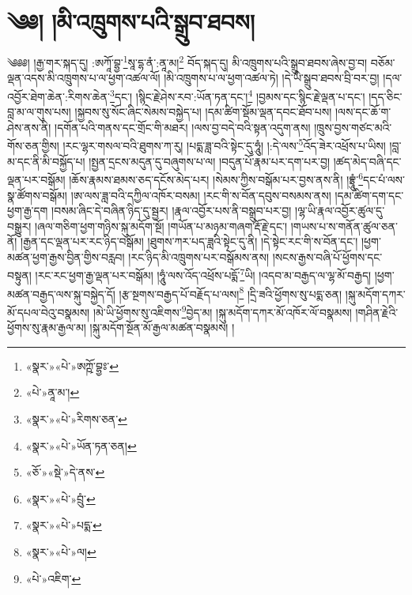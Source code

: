 \chapter{༄༅། །མི་འཁྲུགས་པའི་སྒྲུབ་ཐབས།}༄༅༅། །རྒྱ་གར་སྐད་དུ། :ཨཀཱོ་བྷྱ་\footnote{«སྣར་»«པེ་»ཨཀྵོ་བྷྱཿ་}སཱ་དྷ་ནཾ་:ནཱ་མ།\footnote{«པེ་»ནཱ་མ་།} བོད་སྐད་དུ། མི་འཁྲུགས་པའི་སྒྲུབ་ཐབས་ཞེས་བྱ་བ། བཅོམ་ལྡན་འདས་མི་འཁྲུགས་པ་ལ་ཕྱག་འཚལ་ལོ། །མི་འཁྲུགས་པ་ལ་ཕྱག་འཚལ་ཏེ། །དེ་ཡི་སྒྲུབ་ཐབས་བྲི་བར་བྱ། །དལ་འབྱོར་ཐེག་ཆེན་:རིགས་ཆེན་\footnote{«སྣར་»«པེ་»རིགས་ཅན་}དང་། །སྙིང་རྗེ་ཤེས་རབ་:ཡོན་ཏན་དང་།\footnote{«སྣར་»«པེ་»ཡོན་ཏན་ཅན།} །བྱམས་དང་སྙིང་རྗེ་ལྡན་པ་དང་། །དད་ཅིང་བླ་མ་ལ་གུས་པས། །སྐྱབས་སུ་སོང་ཞིང་སེམས་བསྐྱེད་པ། །དམ་ཚིག་སྡོམ་ལྡན་དབང་ཐོབ་པས། །ལས་དང་ཆོ་ག་ཤེས་ནས་ནི། །དགོན་པའི་གནས་དང་གྲོང་གི་མཐར། །ལས་བྱ་བདེ་བའི་སྟན་འདུག་ནས། །ཁྲུས་བྱས་གཙང་མའི་གོས་ཅན་གྱིས། །རང་ལྷར་གསལ་བའི་ཐུགས་ཀ་རུ། །པདྨ་ཟླ་བའི་སྟེང་དུ་ཧཱུཾ། །:དེ་ལས་\footnote{«ཅོ་»«སྡེ་»དེ་ནས་}འོད་ཟེར་འཕྲོས་པ་ཡིས། །བླ་མ་དང་ནི་མི་བསྐྱོད་པ། །སྤྱན་དྲངས་མདུན་དུ་བཞུགས་པ་ལ། །བདུན་པོ་རྣམ་པར་དག་པར་བྱ། །ཚད་མེད་བཞི་དང་ལྡན་པར་བསྒོམ། །ཆོས་རྣམས་ཐམས་ཅད་དངོས་མེད་པར། །སེམས་ཀྱིས་བསྒོམ་པར་བྱས་ནས་ནི། །བྷྲཱུཾ་\footnote{«སྣར་»«པེ་»བྲུཾ་}དང་པཾ་ལས་སྣ་ཚོགས་བསྒོམ། །ཨ་ལས་ཟླ་བའི་དཀྱིལ་འཁོར་བསམ། །རང་གི་ས་བོན་དབུས་བསམས་ནས། །དམ་ཚིག་དག་དང་ཕྱག་རྒྱ་དག །བསམ་ཞིང་དེ་བཞིན་ཉིད་དུ་སྦྱར། །རྣལ་འབྱོར་པས་ནི་བསྒྲུབ་པར་བྱ། །ལྷ་ཡི་རྣལ་འབྱོར་ཚུལ་དུ་བསྒྱུར། །ཞལ་གཅིག་ཕྱག་གཉིས་སྐུ་མདོག་སྔོ། །གཡོན་པ་མཉམ་གཞག་རྡོ་རྗེ་དང་། །གཡས་པ་ས་གནོན་ཚུལ་ཅན་ནོ། །རྒྱན་དང་ལྡན་པར་རང་ཉིད་བསྒོམ། །ཐུགས་ཀར་པད་ཟླའི་སྟེང་དུ་ནི། །དེ་སྟེང་རང་གི་ས་བོན་དང་། །ཕྱག་མཚན་ཕྱག་རྒྱས་བྱིན་གྱིས་བརླབ། །རང་ཉིད་མི་འཁྲུགས་པར་བསྒོམས་ནས། །སངས་རྒྱས་བཞི་པོ་ཕྱོགས་དང་བསྟུན། །རང་རང་ཕྱག་རྒྱ་ལྡན་པར་བསྒོམ། །ཧཱུཾ་ལས་འོད་འཕྲོས་པདྨོ་\footnote{«སྣར་»«པེ་»པདྨ་}ཡི། །འདབ་མ་བརྒྱད་ལ་ལྷ་མོ་བརྒྱད། །ཕྱག་མཚན་བརྒྱད་ལས་སྐུ་བསྐྱེད་དོ། །རྩ་སྔགས་བརྒྱད་པོ་བརྗོད་པ་ལས།\footnote{«སྣར་»«པེ་»ལ།} །དྲི་ཟའི་ཕྱོགས་སུ་པདྨ་ཅན། །སྐུ་མདོག་དཀར་མོ་དཔལ་བེའུ་བསྣམས། །མེ་ཡི་ཕྱོགས་སུ་འཇིགས་\footnote{«པེ་»འཇིག་}བྱེད་མ། །སྐུ་མདོག་དཀར་མོ་འཁོར་ལོ་བསྣམས། །གཤིན་རྗེའི་ཕྱོགས་སུ་རྣམ་རྒྱལ་མ། །སྐུ་མདོག་སྔོན་མོ་རྒྱལ་མཚན་བསྣམས། །
